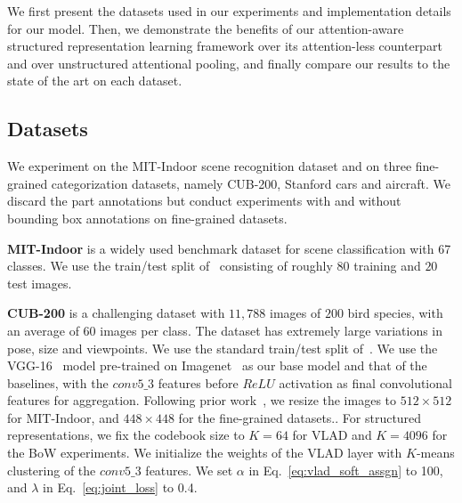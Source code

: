 \documentclass{bmvc2k}
\newcommand{\comment}[1]{}
\newcommand{\ms}[1]{{\color{blue}{#1}}}
\newcommand{\comment}[1]{}
\newcommand{\ms}[1]{ #1 }
\newcommand{\bs}{\mathbf{s}}
\begin{document}
We first present the datasets used in our experiments and implementation details for our model. Then, we demonstrate the benefits of our attention-aware structured representation learning framework over its attention-less counterpart and over unstructured attentional pooling, and finally compare our results to the state of the art on each dataset. 
\ms{We provide additional results and ablation studies in the supplementary material.}\comment{
We report the accuracy of standalone attention module without structured representation in Section~\ref{sec:Attention_results}. The results suggest attention module can be reliably used as weakly-supervised localization of informative regions contributing to target label. 
We then show the benefits of attention-aware structured representation learning framework in Section~\ref{sec:Att_structured} consistently outperforming the attention-less systems.
We finally compare our method with current state-of-the-art in Section~\ref{sec:state-of-the-art}, particularity with methods that use higher order statistics~\cite{bcnn,mfafvnet,netvlad,fisher2013}
}\subsection{Datasets}\label{sec:Datasets}

We experiment on the MIT-Indoor scene recognition dataset and on three fine-grained categorization datasets, namely CUB-200, Stanford cars and aircraft. We discard the part annotations but conduct experiments with and without bounding box annotations on fine-grained datasets.

\textbf{MIT-Indoor} is a widely used benchmark dataset for scene classification with 67 classes.
We use the train/test split of~\cite{mitindoor2009} consisting of roughly $80$ training and $20$ test images.

\textbf{CUB-200}  is a challenging dataset with $11,788$ images of $200$ bird species, with an average of $60$ images per class. The dataset has extremely large variations in pose, size and viewpoints. We use the standard train/test split of~\cite{ucsdbirds}. 
We use the VGG-16~\cite{vgg16} model pre-trained on Imagenet~\cite{Alexnet} as our base model and that of the baselines, with the $conv5\_3$ features before $ReLU$ activation as final convolutional features for aggregation. 
Following prior work~\cite{mfafvnet,bcnn}, we resize the images to $512 \times 512$ for MIT-Indoor,  and $448 \times 448$ for the fine-grained datasets.\comment{Data augmentation is carried out on all datasets by performing random cropping and horizontal flipping.}\ms{At test time, we flip the image and average the predictions for the original and flipped image}. For structured representations, we fix the codebook size to $K=64$ for VLAD and $K=4096$ for the BoW experiments. We initialize the weights  %
of the VLAD layer with $K$-means clustering of the $conv5\_3$ features.
We set $\alpha$ in Eq.~\ref{eq:vlad_soft_assgn} to 100, and $\lambda$ in Eq.~\ref{eq:joint_loss} to 0.4. 
\end{document}
